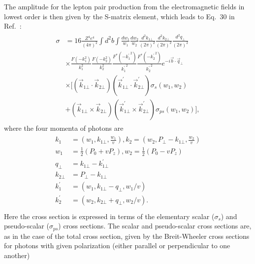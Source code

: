 \documentclass[12pt,epjc3]{svjour3}\sloppy
\begin{document}
The amplitude for the lepton pair production from the electromagnetic fields in lowest order is then given by the S-matrix element, which leads to Eq.~30 in Ref.~\cite{PhysRevC.47.2308}:
\begin{align}
    \label{eq:gEPA}
    \begin{split}
    \sigma & = 16\frac{Z^{4}e^{4}}{(4\pi)^{2}}\int d^{2}b \int \frac{dw_{1}}{w_{1}} \frac{dw_{2}}{w_{2}} \frac{d^{2}k_{1\bot}}{(2\pi)^{2}} \frac{d^{2}k_{2\bot}}{(2\pi)^{2}} \frac{d^{2}q_{\bot}}{(2\pi)^{2}}\\
     &\times \frac{F(-k_{1}^{2})}{k_{1}^{2}} \frac{F(-k_{2}^{2})}{k_{2}^{2}} \frac{F^{*}(-{k_{1}^{\prime}}^{2})}{{k_{1}^{\prime}}^{2}} \frac{F^{*}(-{k_{2}^{\prime}}^{2})}{{k_{2}^{\prime}}^{2}} e^{-i\vec{b} \cdot \vec{q}_{\bot}} \\
     & \times \big[(\vec{k}_{1\bot} \cdot \vec{k}_{2\bot})(\vec{k}^{\prime}_{1\bot} \cdot \vec{k}^{\prime}_{2\bot}) \sigma_{s}(w_{1},w_{2})\\
     & +(\vec{k}_{1\bot} \times \vec{k}_{2\bot})(\vec{k}^{\prime}_{1\bot} \times \vec{k}^{\prime}_{2\bot})\sigma_{ps}(w_{1},w_{2})\big], 
    \end{split}
\end{align}
where the four momenta of photons are
\begin{align}
    \label{equation4}
    \begin{split}
    k_{1} & = (w_{1}, k_{1\bot},\frac{w_{1}}{v}), k_{2} = (w_{2}, P_{\bot} - k_{1\bot},\frac{w_{2}}{v})\\
    w_{1} & =\frac{1}{2}(P_{0}+vP_{z}), w_{2} = \frac{1}{2}(P_{0}-vP_{z}) \\
    q_{\bot} & = k_{1\bot} -k_{1\bot}^{\prime} \\
    k_{2\bot} & = P_{\bot} - k_{1\bot} \\
    k_{1}^{\prime} & =(w_{1}, k_{1\bot} - q_{\bot},w_{1}/v)\\
    k_{2}^{\prime} & =(w_{2}, k_{2\bot} + q_{\bot},w_{2}/v).\\
    \end{split}
\end{align}
Here the cross section is expressed in terms of the elementary scalar ($\sigma_s$) and pseudo-scalar ($\sigma_{ps}$) cross sections. The scalar and pseudo-scalar cross sections are, as in the case of the total cross section, given by the Breit-Wheeler cross sections for photons with given polarization (either parallel or perpendicular to one another)
\end{document}
